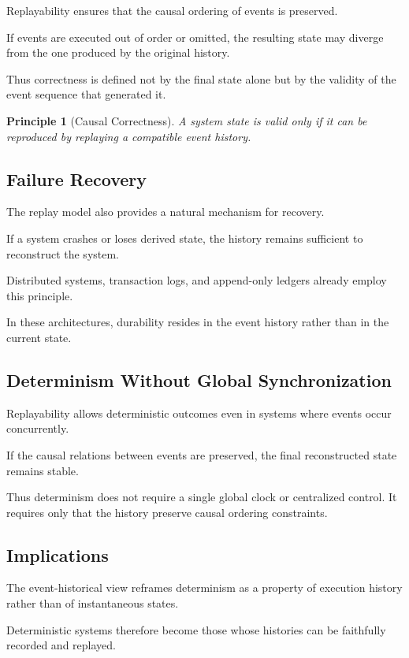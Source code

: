 \documentclass[12pt]{article}
\newtheorem{principle}{Principle}
\begin{document}
Replayability ensures that the causal ordering
of events is preserved.

If events are executed out of order or omitted,
the resulting state may diverge from the one
produced by the original history.

Thus correctness is defined not by the final state
alone but by the validity of the event sequence
that generated it.

\begin{principle}[Causal Correctness]
A system state is valid only if it can be reproduced
by replaying a compatible event history.
\end{principle}

\subsection{Failure Recovery}

The replay model also provides a natural mechanism
for recovery.

If a system crashes or loses derived state,
the history remains sufficient to reconstruct
the system.

Distributed systems, transaction logs,
and append-only ledgers already employ this principle.

In these architectures, durability resides
in the event history rather than in the current state.

\subsection{Determinism Without Global Synchronization}

Replayability allows deterministic outcomes
even in systems where events occur concurrently.

If the causal relations between events are preserved,
the final reconstructed state remains stable.

Thus determinism does not require a single global clock
or centralized control. It requires only that the
history preserve causal ordering constraints.

\subsection{Implications}

The event-historical view reframes determinism
as a property of execution history rather than
of instantaneous states.

Deterministic systems therefore become those whose
histories can be faithfully recorded and replayed.
\end{document}
